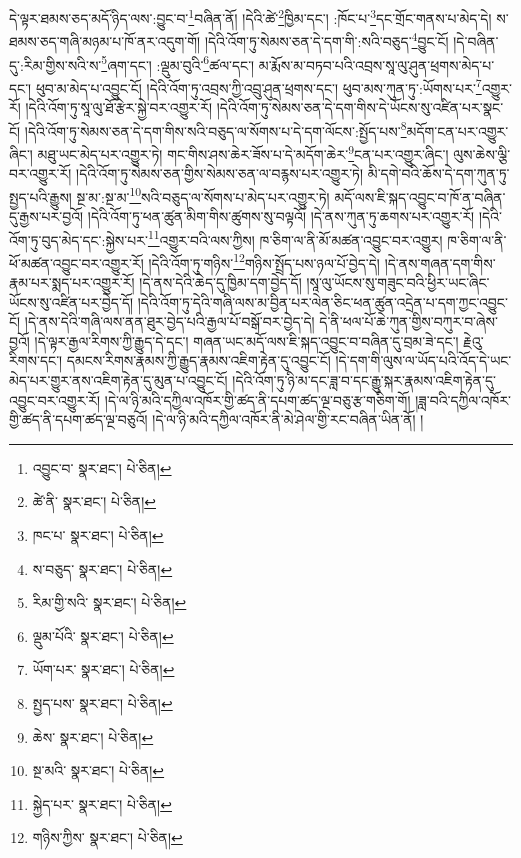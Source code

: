 དེ་ལྟར་ཐམས་ཅད་མདོ་ཉིད་ལས་:བྱུང་བ་\footnote{འབྱུང་བ་  སྣར་ཐང་།  པེ་ཅིན། }བཞིན་ནོ། །དེའི་ཚེ་\footnote{ཚེ་ནི་  སྣར་ཐང་།  པེ་ཅིན། }ཁྱིམ་དང་། :ཁོང་པ་\footnote{ཁང་པ་  སྣར་ཐང་།  པེ་ཅིན། }དང་གྲོང་གནས་པ་མེད་དེ། ས་ཐམས་ཅད་གཞི་མཉམ་པ་ཁོ་ནར་འདུག་གོ། །དེའི་འོག་ཏུ་སེམས་ཅན་དེ་དག་གི་:སའི་བཅུད་\footnote{ས་བཅུད་  སྣར་ཐང་།  པེ་ཅིན། }བྱུང་ངོ། །དེ་བཞིན་དུ་:རིམ་གྱིས་སའི་ས་\footnote{རིམ་གྱི་སའི་  སྣར་ཐང་།  པེ་ཅིན། }ཞག་དང་། :ལྡུམ་བུའི་\footnote{ལྡུམ་པོའི་  སྣར་ཐང་།  པེ་ཅིན། }ཚལ་དང་། མ་རྨོས་མ་བཏབ་པའི་འབྲས་སཱ་ལུ་ཤུན་ཕྲགས་མེད་པ་དང་། ཕུབ་མ་མེད་པ་འབྱུང་ངོ། །དེའི་འོག་ཏུ་འབྲས་ཀྱི་འབྲུ་ཤུན་ཕྲགས་དང་། ཕུབ་མས་ཀུན་ཏུ་:ཡོགས་པར་\footnote{ཡོག་པར་  སྣར་ཐང་།  པེ་ཅིན། }འགྱུར་རོ། །དེའི་འོག་ཏུ་སཱ་ལུ་ཐོ་རྩེར་སྐྱེ་བར་འགྱུར་རོ། །དེའི་འོག་ཏུ་སེམས་ཅན་དེ་དག་གིས་དེ་ཡོངས་སུ་འཛིན་པར་སྣང་ངོ། །དེའི་འོག་ཏུ་སེམས་ཅན་དེ་དག་གིས་སའི་བཅུད་ལ་སོགས་པ་དེ་དག་ལོངས་:སྤྱོད་པས་\footnote{སྤྱད་པས་  སྣར་ཐང་།  པེ་ཅིན། }མདོག་ངན་པར་འགྱུར་ཞིང་། མཐུ་ཡང་མེད་པར་འགྱུར་ཏེ། གང་གིས་ཤས་ཆེར་ཟོས་པ་དེ་མདོག་ཆེར་\footnote{ཆེས་  སྣར་ཐང་།  པེ་ཅིན། }ངན་པར་འགྱུར་ཞིང་། ལུས་ཆེས་ལྕི་བར་འགྱུར་རོ། །དེའི་འོག་ཏུ་སེམས་ཅན་གྱིས་སེམས་ཅན་ལ་བརྙས་པར་འགྱུར་ཏེ། མི་དགེ་བའི་ཆོས་དེ་དག་ཀུན་ཏུ་སྤྱད་པའི་རྒྱུས། སྔ་མ་:སྔ་མ་\footnote{སྔ་མའི་  སྣར་ཐང་།  པེ་ཅིན། }སའི་བཅུད་ལ་སོགས་པ་མེད་པར་འགྱུར་ཏེ། མདོ་ལས་ཇི་སྐད་འབྱུང་བ་ཁོ་ན་བཞིན་དུ་རྒྱས་པར་བྱའོ། །དེའི་འོག་ཏུ་ཕན་ཚུན་མིག་གིས་ཚུགས་སུ་བལྟའོ། །དེ་ནས་ཀུན་ཏུ་ཆགས་པར་འགྱུར་རོ། །དེའི་འོག་ཏུ་བུད་མེད་དང་:སྐྱེས་པར་\footnote{སྐྱེད་པར་  སྣར་ཐང་།  པེ་ཅིན། }འགྱུར་བའི་ལས་ཀྱིས། ཁ་ཅིག་ལ་ནི་མོ་མཚན་འབྱུང་བར་འགྱུར། ཁ་ཅིག་ལ་ནི་ཕོ་མཚན་འབྱུང་བར་འགྱུར་རོ། །དེའི་འོག་ཏུ་གཉིས་\footnote{གཉིས་ཀྱིས་  སྣར་ཐང་།  པེ་ཅིན། }གཉིས་སྤྲོད་པས་ཉལ་པོ་བྱེད་དེ། །དེ་ནས་གཞན་དག་གིས་རྣམ་པར་སྨད་པར་འགྱུར་རོ། །དེ་ནས་དེའི་ཆེད་དུ་ཁྱིམ་དག་བྱེད་དོ། །སཱ་ལུ་ཡོངས་སུ་གཟུང་བའི་ཕྱིར་ཡང་ཞིང་ཡོངས་སུ་འཛིན་པར་བྱེད་དོ། །དེའི་འོག་ཏུ་དེའི་གཞི་ལས་མ་བྱིན་པར་ལེན་ཅིང་ཕན་ཚུན་འདྲེན་པ་དག་ཀྱང་འབྱུང་ངོ། །དེ་ནས་དེའི་གཞི་ལས་ནན་ཐུར་བྱེད་པའི་རྒྱལ་པོ་བསྒོ་བར་བྱེད་དེ། དེ་ནི་ཕལ་པོ་ཆེ་ཀུན་གྱིས་བཀུར་བ་ཞེས་བྱའོ། །དེ་ལྟར་རྒྱལ་རིགས་ཀྱི་རྒྱུད་དེ་དང་། གཞན་ཡང་མདོ་ལས་ཇི་སྐད་འབྱུང་བ་བཞིན་དུ་བྲམ་ཟེ་དང་། རྗེའུ་རིགས་དང་། དམངས་རིགས་རྣམས་ཀྱི་རྒྱུད་རྣམས་འཇིག་རྟེན་དུ་འབྱུང་ངོ། །དེ་དག་གི་ལུས་ལ་ཡོད་པའི་འོད་དེ་ཡང་མེད་པར་གྱུར་ནས་འཇིག་རྟེན་དུ་མུན་པ་འབྱུང་ངོ། །དེའི་འོག་ཏུ་ཉི་མ་དང་ཟླ་བ་དང་རྒྱུ་སྐར་རྣམས་འཇིག་རྟེན་དུ་འབྱུང་བར་འགྱུར་རོ། །དེ་ལ་ཉི་མའི་དཀྱིལ་འཁོར་གྱི་ཚད་ནི་དཔག་ཚད་ལྔ་བཅུ་རྩ་གཅིག་གོ། །ཟླ་བའི་དཀྱིལ་འཁོར་གྱི་ཚད་ནི་དཔག་ཚད་ལྔ་བཅུའོ། །དེ་ལ་ཉི་མའི་དཀྱིལ་འཁོར་ནི་མེ་ཤེལ་གྱི་རང་བཞིན་ཡིན་ནོ། །
